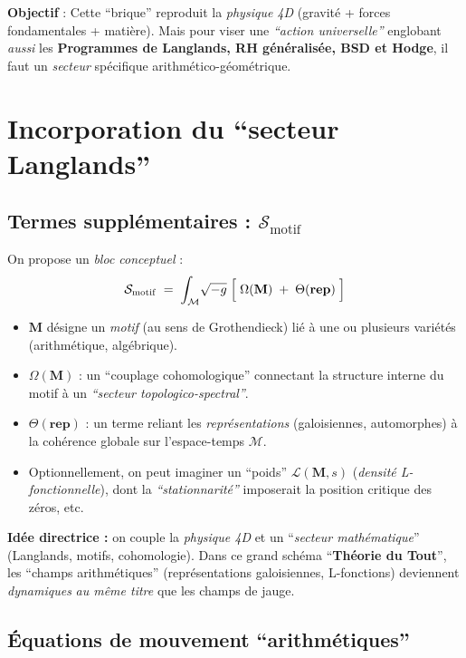\documentclass[11pt]{article}
\begin{document}
\noindent
\textbf{Objectif} : Cette “brique” reproduit la \emph{physique 4D} (gravité + forces fondamentales + matière). Mais pour viser une \emph{“action universelle”} englobant \emph{aussi} les \textbf{Programmes de Langlands, RH généralisée, BSD et Hodge}, il faut un \emph{secteur} spécifique arithmético-géométrique.

\section{Incorporation du “secteur Langlands”}
\label{sec:langlands_sector}

\subsection{Termes supplémentaires : \texorpdfstring{$\mathcal{S}_{\mathrm{motif}}$}{S motif}}
On propose un \emph{bloc conceptuel} :
\[
\mathcal{S}_{\mathrm{motif}}
\;=\;
\int_{\mathcal{M}} \!\sqrt{-g}\;\Bigl[\;\Omega(\mathbf{M})\;+\;\Theta(\mathbf{rep})\;\Bigr]
\]
\begin{itemize}
  \item \(\mathbf{M}\) désigne un \emph{motif} (au sens de Grothendieck) lié à une ou plusieurs variétés (arithmétique, algébrique).
  \item \(\Omega(\mathbf{M})\) : un “couplage cohomologique” connectant la structure interne du motif à un \emph{“secteur topologico-spectral”}.
  \item \(\Theta(\mathbf{rep})\) : un terme reliant les \emph{représentations} (galoisiennes, automorphes) à la cohérence globale sur l'espace-temps \(\mathcal{M}\).  
  \item Optionnellement, on peut imaginer un “poids” \(\mathcal{L}(\mathbf{M}, s)\) (\emph{densité L-fonctionnelle}), dont la \emph{“stationnarité”} imposerait la position critique des zéros, etc.
\end{itemize}

\noindent
\textbf{Idée directrice :} on couple la \emph{physique 4D} et un “\emph{secteur mathématique}” (Langlands, motifs, cohomologie). Dans ce grand schéma “\textbf{Théorie du Tout}”, les “champs arithmétiques” (représentations galoisiennes, L-fonctions) deviennent \emph{dynamiques} \emph{au même titre} que les champs de jauge.

\subsection{Équations de mouvement “arithmétiques”}
\label{ssec:arith_movement}
\end{document}

